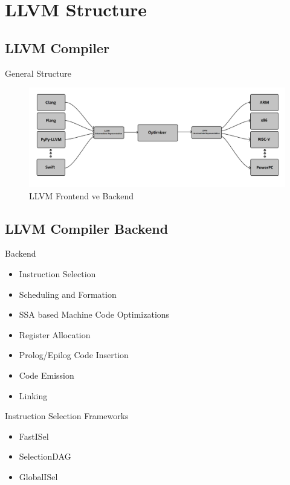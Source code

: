 \section{LLVM Structure} %

\subsection{LLVM Compiler}
\begin{frame}{General Structure}
    \begin{figure}
	   \includegraphics[width=0.8\linewidth]{llvm_diagram.png}
	   \caption{LLVM Frontend ve Backend}
	\end{figure}
\end{frame}

\subsection{LLVM Compiler Backend}
\begin{frame}{Backend}
    \begin{itemize}
        \item Instruction Selection
        \item Scheduling and Formation
        \item SSA based Machine Code Optimizations
        \item Register Allocation
        \item Prolog/Epilog Code Insertion
        \item Code Emission
        \item Linking
        
    \end{itemize}
\end{frame}

\begin{frame}{Instruction Selection Frameworks}
    \begin{itemize}
        \item FastISel
        \item SelectionDAG
        \item GlobalISel
    \end{itemize}
\end{frame}

